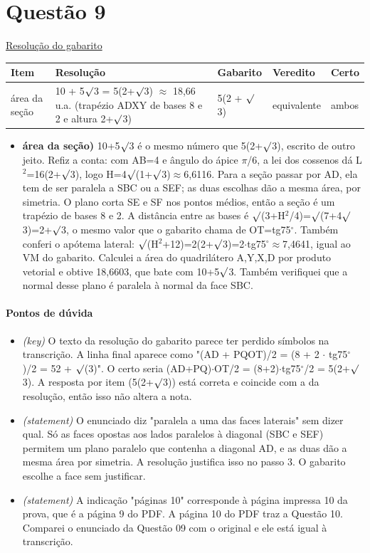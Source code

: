 \documentclass{article}%
\begin{document}
\section*{Questão 9}%
\href{https://poliedroresolve.sistemapoliedro.com.br/vestibulares/ita/2027/ita-2-fase-dia-1-20-10-2026-2-fase-dia-1/dissertativa-9-matematica-2-fase-dia-1-ita-2027}{Resolução do gabarito}\par\smallskip%
\begin{longtable}{@{}p{} p{} p{} p{} p{}@{}}\toprule Item & Resolução & Gabarito & Veredito & Certo \\ \midrule
área da seção & 10 + 5$\surd$3 = 5(2+$\surd$3) $\approx$ 18,66 u.a. (trapézio ADXY de bases 8 e 2 e altura 2+$\surd$3) & 5(2 + $\surd$3) & equivalente & ambos \\
\bottomrule\end{longtable}%
\begin{itemize}%
\item%
\textbf{área da seção)} 10+5$\surd$3 é o mesmo número que 5(2+$\surd$3), escrito de outro jeito. Refiz a conta: com AB=4 e ângulo do ápice $\pi$/6, a lei dos cossenos dá L$^2$=16(2+$\surd$3), logo H=4$\surd$(1+$\surd$3)$\approx$6,6116. Para a seção passar por AD, ela tem de ser paralela a SBC ou a SEF; as duas escolhas dão a mesma área, por simetria. O plano corta SE e SF nos pontos médios, então a seção é um trapézio de bases 8 e 2. A distância entre as bases é $\surd$(3+H$^2$/4)=$\surd$(7+4$\surd$3)=2+$\surd$3, o mesmo valor que o gabarito chama de OT=tg75$^\circ$. Também conferi o apótema lateral: $\surd$(H$^2$+12)=2(2+$\surd$3)=2$\cdot$tg75$^\circ$$\approx$7,4641, igual ao VM do gabarito. Calculei a área do quadrilátero A,Y,X,D por produto vetorial e obtive 18,6603, que bate com 10+5$\surd$3. Também verifiquei que a normal desse plano é paralela à normal da face SBC.%
\end{itemize}%
\paragraph{Pontos de dúvida}%
\begin{itemize}%
\item%
\textit{(key)} O texto da resolução do gabarito parece ter perdido símbolos na transcrição. A linha final aparece como "(AD + PQOT)/2 = (8 + 2 $\cdot$ tg75$^\circ$)/2 = 52 + $\surd$(3)". O certo seria (AD+PQ)$\cdot$OT/2 = (8+2)$\cdot$tg75$^\circ$/2 = 5(2+$\surd$3). A resposta por item (5(2+$\surd$3)) está correta e coincide com a da resolução, então isso não altera a nota.%
\item%
\textit{(statement)} O enunciado diz "paralela a uma das faces laterais" sem dizer qual. Só as faces opostas aos lados paralelos à diagonal (SBC e SEF) permitem um plano paralelo que contenha a diagonal AD, e as duas dão a mesma área por simetria. A resolução justifica isso no passo 3. O gabarito escolhe a face sem justificar.%
\item%
\textit{(statement)} A indicação "páginas 10" corresponde à página impressa 10 da prova, que é a página 9 do PDF. A página 10 do PDF traz a Questão 10. Comparei o enunciado da Questão 09 com o original e ele está igual à transcrição.%
\end{itemize}%
\end{document}
